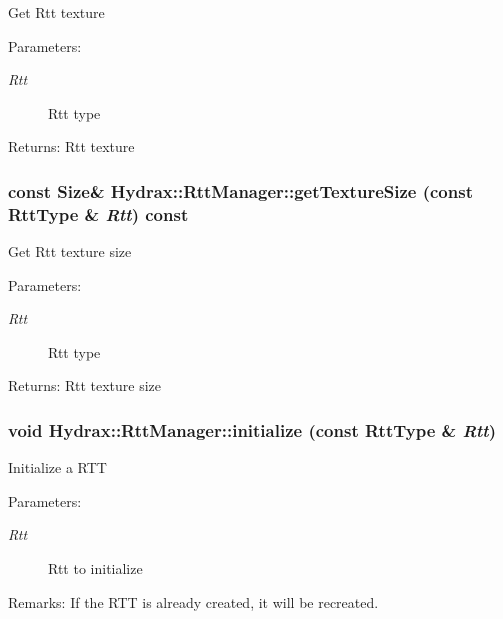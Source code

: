 \begin{CompactItemize}
Get Rtt texture \begin{Desc}
\item[Parameters:]
\begin{description}
\item[{\em Rtt}]Rtt type \end{description}
\end{Desc}
\begin{Desc}
\item[Returns:]Rtt texture \end{Desc}
\hypertarget{class_hydrax_1_1_rtt_manager_ceb8b7c524ce0e35e493771dab50b4c9}{
\subsubsection[{getTextureSize}]{\setlength{\rightskip}{0pt plus 5cm}const {\bf Size}\& Hydrax::RttManager::getTextureSize (const {\bf RttType} \& {\em Rtt}) const}}
\label{class_hydrax_1_1_rtt_manager_ceb8b7c524ce0e35e493771dab50b4c9}


Get Rtt texture size \begin{Desc}
\item[Parameters:]
\begin{description}
\item[{\em Rtt}]Rtt type \end{description}
\end{Desc}
\begin{Desc}
\item[Returns:]Rtt texture size \end{Desc}
\hypertarget{class_hydrax_1_1_rtt_manager_774efa00a79ade65e726ed0774d2ac2e}{
\subsubsection[{initialize}]{\setlength{\rightskip}{0pt plus 5cm}void Hydrax::RttManager::initialize (const {\bf RttType} \& {\em Rtt})}}
\label{class_hydrax_1_1_rtt_manager_774efa00a79ade65e726ed0774d2ac2e}


Initialize a RTT \begin{Desc}
\item[Parameters:]
\begin{description}
\item[{\em Rtt}]Rtt to initialize \end{description}
\end{Desc}
\begin{Desc}
\item[Remarks:]If the RTT is already created, it will be recreated. \end{Desc}
\hypertarget{class_hydrax_1_1_rtt_manager_360139ed63706da8ca9ec04716d65574}{
}
\end{CompactItemize}
